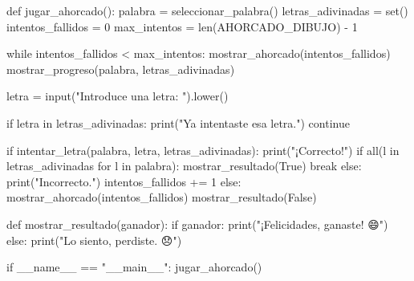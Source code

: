 \documentclass[
  a4paper,
  DIV=11,
  numbers=noendperiod,
  onepage,
  openany]{scrreprt}
\newenvironment{Shaded}{\begin{snugshade}}{\end{snugshade}}
\newcommand{\BuiltInTok}[1]{\textcolor[rgb]{0.00,0.23,0.31}{#1}}
\newcommand{\ControlFlowTok}[1]{\textcolor[rgb]{0.00,0.23,0.31}{#1}}
\newcommand{\DecValTok}[1]{\textcolor[rgb]{0.68,0.00,0.00}{#1}}
\newcommand{\KeywordTok}[1]{\textcolor[rgb]{0.00,0.23,0.31}{#1}}
\newcommand{\NormalTok}[1]{\textcolor[rgb]{0.00,0.23,0.31}{#1}}
\newcommand{\OperatorTok}[1]{\textcolor[rgb]{0.37,0.37,0.37}{#1}}
\newcommand{\StringTok}[1]{\textcolor[rgb]{0.13,0.47,0.30}{#1}}
\newcommand{\VariableTok}[1]{\textcolor[rgb]{0.07,0.07,0.07}{#1}}
\begin{document}
\begin{Shaded}
\begin{Highlighting}[]
\KeywordTok{def}\NormalTok{ jugar\_ahorcado():}
\NormalTok{    palabra }\OperatorTok{=}\NormalTok{ seleccionar\_palabra()}
\NormalTok{    letras\_adivinadas }\OperatorTok{=} \BuiltInTok{set}\NormalTok{()}
\NormalTok{    intentos\_fallidos }\OperatorTok{=} \DecValTok{0}
\NormalTok{    max\_intentos }\OperatorTok{=} \BuiltInTok{len}\NormalTok{(AHORCADO\_DIBUJO) }\OperatorTok{{-}} \DecValTok{1}

    \ControlFlowTok{while}\NormalTok{ intentos\_fallidos }\OperatorTok{\textless{}}\NormalTok{ max\_intentos:}
\NormalTok{        mostrar\_ahorcado(intentos\_fallidos)}
\NormalTok{        mostrar\_progreso(palabra, letras\_adivinadas)}
        
\NormalTok{        letra }\OperatorTok{=} \BuiltInTok{input}\NormalTok{(}\StringTok{"Introduce una letra: "}\NormalTok{).lower()}
        
        \ControlFlowTok{if}\NormalTok{ letra }\KeywordTok{in}\NormalTok{ letras\_adivinadas:}
            \BuiltInTok{print}\NormalTok{(}\StringTok{"Ya intentaste esa letra."}\NormalTok{)}
            \ControlFlowTok{continue}
        
        \ControlFlowTok{if}\NormalTok{ intentar\_letra(palabra, letra, letras\_adivinadas):}
            \BuiltInTok{print}\NormalTok{(}\StringTok{"¡Correcto!"}\NormalTok{)}
            \ControlFlowTok{if} \BuiltInTok{all}\NormalTok{(l }\KeywordTok{in}\NormalTok{ letras\_adivinadas }\ControlFlowTok{for}\NormalTok{ l }\KeywordTok{in}\NormalTok{ palabra):}
\NormalTok{                mostrar\_resultado(}\VariableTok{True}\NormalTok{)}
                \ControlFlowTok{break}
        \ControlFlowTok{else}\NormalTok{:}
            \BuiltInTok{print}\NormalTok{(}\StringTok{"Incorrecto."}\NormalTok{)}
\NormalTok{            intentos\_fallidos }\OperatorTok{+=} \DecValTok{1}
    \ControlFlowTok{else}\NormalTok{:}
\NormalTok{        mostrar\_ahorcado(intentos\_fallidos)}
\NormalTok{        mostrar\_resultado(}\VariableTok{False}\NormalTok{)}

\KeywordTok{def}\NormalTok{ mostrar\_resultado(ganador):}
    \ControlFlowTok{if}\NormalTok{ ganador:}
        \BuiltInTok{print}\NormalTok{(}\StringTok{"¡Felicidades, ganaste! 😄"}\NormalTok{)}
    \ControlFlowTok{else}\NormalTok{:}
        \BuiltInTok{print}\NormalTok{(}\StringTok{"Lo siento, perdiste. 😞"}\NormalTok{)}

\ControlFlowTok{if} \VariableTok{\_\_name\_\_} \OperatorTok{==} \StringTok{"\_\_main\_\_"}\NormalTok{:}
\NormalTok{    jugar\_ahorcado()}
\end{Highlighting}
\end{Shaded}
\end{document}
